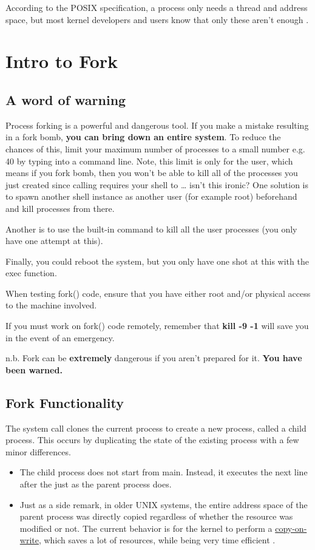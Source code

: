 According to the POSIX specification, a process only needs a thread and address space, but most kernel developers and users know that only these aren't enough \cite{process_def}.

\section{Intro to Fork}

\subsection{A word of warning}

Process forking is a powerful and dangerous tool.
If you make a mistake resulting in a fork bomb, \textbf{you can bring down an entire system}.
To reduce the chances of this, limit your maximum number of processes to a small number e.g. 40 by typing  into a command line.
Note, this limit is only for the user, which means if you fork bomb, then you won't be able to kill all of the processes you just created since calling  requires your shell to  \ldots{} isn't this ironic? One solution is to spawn another shell instance as another user (for example root) beforehand and kill processes from there.

Another is to use the built-in  command to kill all the user processes (you only have one attempt at this).

Finally, you could reboot the system, but you only have one shot at this with the exec function.

When testing fork() code, ensure that you have either root and/or physical access to the machine involved.

If you must work on fork() code remotely, remember that \textbf{kill -9 -1} will save you in the event of an emergency.

n.b. Fork can be \textbf{extremely} dangerous if you aren't prepared for it. \textbf{You have been warned.}

\subsection{Fork Functionality}

The  system call clones the current process to create a new process, called a child process.
This occurs by duplicating the state of the existing process with a few minor differences.
\begin{itemize}
    \item The child process does not start from main. Instead, it executes the next line after the  just as the parent process does.
    \item Just as a side remark, in older UNIX systems, the entire address space of the parent process was directly copied regardless of whether the resource was modified or not. The current behavior is for the kernel to perform a \href{https://en.wikipedia.org/wiki/Copy-on-write}{copy-on-write}, which saves a lot of resources, while being very time efficient \cite[Copy-on-write section]{Bovet:2005:ULK:1077084}.
\end{itemize}

